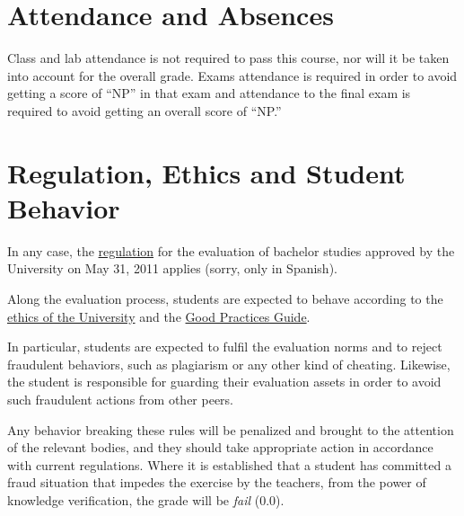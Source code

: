 \documentclass[11pt, a4paper, twoside]{article}
\begin{document}
\section{Attendance and Absences}

Class and lab attendance is not required to pass this course, nor will it be
taken into account for the overall grade. Exams attendance is required in order
to avoid getting a score of ``NP'' in that exam and attendance to the final
exam is required to avoid getting an overall score of ``NP.''

\section{Regulation, Ethics and Student Behavior}

In any case, the
\href{http://www.uc3m.es/portal/page/portal/organizacion/secret_general/normativa/estudiantes/estudios_grado/normativa-evaluacion-continua-31-05-11_FINALx.pdf}{regulation}
  for the evaluation of bachelor studies approved by the University on May 31,
2011 applies (sorry, only in Spanish).

Along the evaluation process, students are expected to behave according to the
\href{http://www.uc3m.es/portal/page/portal/conocenos/nuestros_estudios/grados/tu_compromiso_universidad}{ethics
of the University} and the
\href{http://www.uc3m.es/ss/Satellite/UC3MInstitucional/en/TextoMixta/1371206782958/Guia_de_las_buenas_practicas}{Good
Practices Guide}.

In particular, students are expected to fulfil the evaluation norms and to
reject fraudulent behaviors, such as plagiarism or any other kind of cheating.
Likewise, the student is responsible for guarding their evaluation assets in
order to avoid such fraudulent actions from other peers.

Any behavior breaking these rules will be penalized and brought to the
attention of the relevant bodies, and they should take appropriate action in
accordance with current regulations. Where it is established that a student has
committed a fraud situation that impedes the exercise by the teachers, from the
power of knowledge verification, the grade will be \emph{fail} (0.0).
\end{document}
